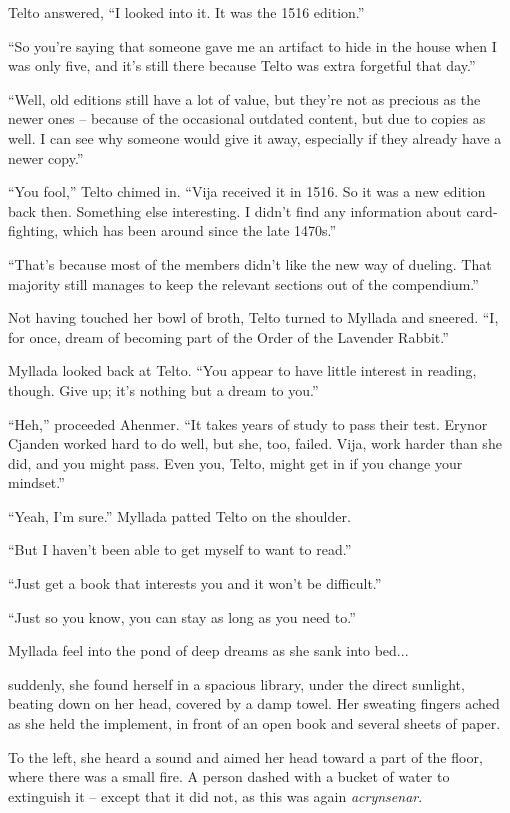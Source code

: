 Telto answered, ``I looked into it. It was the 1516 edition.''

``So you're saying that someone gave me an artifact to hide in the house when I was only five, and it's still there because Telto was extra forgetful that day.''

``Well, old editions still have a lot of value, but they're not as precious as the newer ones -- because of the occasional outdated content, but due to copies as well. I can see why someone would give it away, especially if they already have a newer copy.''

``You fool,'' Telto chimed in. ``Vija received it in 1516. So it was a new edition back then. Something else interesting. I didn't find any information about card-fighting, which has been around since the late 1470s.''

``That's because most of the members didn't like the new way of dueling. That majority still manages to keep the relevant sections out of the compendium.''

Not having touched her bowl of broth, Telto turned to Myllada and sneered. ``I, for once, dream of becoming part of the Order of the Lavender Rabbit.''

Myllada looked back at Telto. ``You appear to have little interest in reading, though. Give up; it's nothing but a dream to you.''

``Heh,'' proceeded Ahenmer. ``It takes years of study to pass their test. Erynor Cjanden worked hard to do well, but she, too, failed. Vija, work harder than she did, and you might pass. Even you, Telto, might get in if you change your mindset.''

``Yeah, I'm sure.'' Myllada patted Telto on the shoulder.

``But I haven't been able to get myself to want to read.''

``Just get a book that interests you and it won't be difficult.''

``Just so you know, you can stay as long as you need to.''

\centeredstars

Myllada feel into the pond of deep dreams as she sank into bed...

suddenly, she found herself in a spacious library, under the direct sunlight, beating down on her head, covered by a damp towel. Her sweating fingers ached as she held the implement, in front of an open book and several sheets of paper.

To the left, she heard a sound and aimed her head toward a part of the floor, where there was a small fire. A person dashed with a bucket of water to extinguish it -- except that it did not, as this was again \emph{acrynsenar}.

